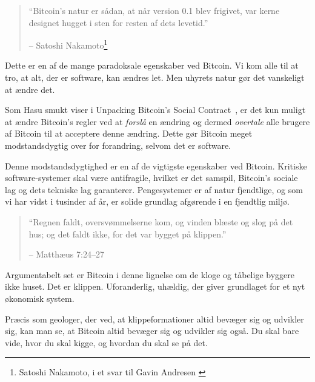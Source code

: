\begin{quotation}\begin{samepage}
\enquote{Bitcoin's natur er sådan, at når version 0.1 blev frigivet, var
kerne designet hugget i sten for resten af dets levetid.}
\begin{flushright} -- Satoshi Nakamoto\footnote{Satoshi Nakamoto, i et svar 
    til Gavin Andresen \cite{satoshi-centralized-nature}}
\end{flushright}\end{samepage}\end{quotation}

Dette er en af de mange paradoksale egenskaber ved Bitcoin. Vi kom alle
til at tro, at alt, der er software, kan ændres let. Men
uhyrets natur gør det vanskeligt at ændre det.

Som Hasu smukt viser i Unpacking Bitcoin's Social
Contract~\cite{social-contract}, er det kun muligt at ændre Bitcoin's regler
ved at \textit{forslå} en ændring og dermed \textit{overtale} alle brugere
af Bitcoin til at acceptere denne ændring. Dette gør Bitcoin meget 
modstandsdygtig over for forandring,
selvom det er software.

Denne modstandsdygtighed er en af de vigtigste egenskaber ved Bitcoin.
Kritiske software-systemer skal være antifragile, hvilket er det
samspil, Bitcoin's sociale lag og dets tekniske lag garanterer.
Pengesystemer er af natur fjendtlige, og som vi har vidst i
tusinder af år, er solide grundlag afgørende i en fjendtlig
miljø.

\begin{quotation}\begin{samepage}
    \enquote{Regnen faldt, oversvømmelserne kom, og vinden blæste og slog på
    det hus; og det faldt ikke, for det var bygget på klippen.}
    \begin{flushright} -- Matthæus 7:24--27
\end{flushright}\end{samepage}\end{quotation}

Argumentabelt set er Bitcoin i denne lignelse om de kloge og tåbelige byggere
ikke huset. Det er klippen. Uforanderlig, uhældig, der giver grundlaget for et 
nyt økonomisk system.

Præcis som geologer, der ved, at klippeformationer altid bevæger sig
og udvikler sig, kan man se, at Bitcoin altid bevæger sig og udvikler sig også.
Du skal bare vide, hvor du skal kigge, og hvordan du skal se på det.


